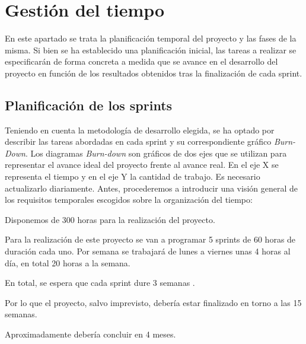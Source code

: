 \section{Gestión del tiempo}
En este apartado se trata la planificación temporal del proyecto y las fases de la misma. Si bien se ha  establecido una planificación inicial, las tareas a realizar se especificarán de forma concreta a medida que se avance en el desarrollo del proyecto en función de los resultados obtenidos tras la finalización de cada sprint.

\subsection{Planificación de los sprints}

Teniendo en cuenta la metodología de desarrollo elegida, se ha optado por describir las tareas abordadas en cada sprint y su correspondiente gráfico \textit{Burn-Down}. Los diagramas \textit{Burn-down} son gráficos de dos ejes que se utilizan para representar el avance ideal del proyecto frente al avance real. En el eje X se representa el tiempo y en el eje Y la cantidad de trabajo. Es necesario actualizarlo diariamente. Antes, procederemos a introducir una visión general de los requisitos temporales escogidos sobre la organización del tiempo:

Disponemos de 300 horas para la realización del proyecto.

Para la realización de este proyecto se van a programar 5 sprints de 60 horas de duración cada uno. Por semana se trabajará de lunes a viernes unas 4 horas al día, en total 20 horas a la semana.

En total, se espera que cada sprint dure 3 semanas .

Por lo que el proyecto, salvo imprevisto, debería estar finalizado en torno a las 15 semanas. 

Aproximadamente debería concluir en 4 meses.

